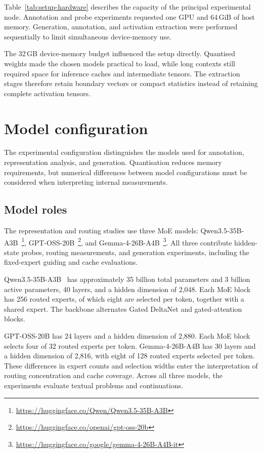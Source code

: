 \documentclass[12pt,a4paper,twoside,openright]{book}
\begin{document}
Table~\ref{tab:setup-hardware} describes the capacity of the principal
experimental node. Annotation and probe experiments requested one GPU and
64\,GiB of host memory. Generation, annotation, and activation extraction
were performed sequentially to limit simultaneous device-memory use.

The 32\,GB device-memory budget influenced the setup directly. Quantised
weights made the chosen models practical to load, while long contexts still
required space for inference caches and intermediate tensors. The extraction
stages therefore retain boundary vectors or compact statistics instead of
retaining complete activation tensors.

\section{Model configuration}
\label{sec:setup-software}

The experimental configuration distinguishes the models used for annotation,
representation analysis, and generation. Quantisation reduces memory
requirements, but numerical differences between model configurations must
be considered when interpreting internal measurements.

\subsection{Model roles}

The representation and routing studies use three MoE models:
Qwen3.5-35B-A3B~\cite{qwen2026qwen35release}\footnote{\url{https://huggingface.co/Qwen/Qwen3.5-35B-A3B}},
GPT-OSS-20B~\cite{openai2025gptoss}\footnote{\url{https://huggingface.co/openai/gpt-oss-20b}},
and Gemma-4-26B-A4B~\cite{gemmateam2026gemma4}\footnote{\url{https://huggingface.co/google/gemma-4-26B-A4B-it}}.
All three contribute
hidden-state probes, routing measurements, and generation experiments,
including the fixed-expert guiding and cache evaluations.

Qwen3.5-35B-A3B~\cite{qwen2026qwen35} has approximately 35 billion total
parameters and 3 billion active parameters, 40 layers, and a hidden dimension
of 2,048. Each MoE block has
256 routed experts, of which eight are selected per token, together with a
shared expert. The backbone alternates Gated DeltaNet and gated-attention
blocks.

GPT-OSS-20B has 24 layers and a hidden dimension of 2,880. Each MoE block
selects four of 32 routed experts per token. Gemma-4-26B-A4B has 30 layers and
a hidden dimension of 2,816, with eight of 128 routed experts selected per
token. These differences in expert counts and selection widths enter the
interpretation of routing concentration and cache coverage. Across all three
models, the experiments evaluate textual problems and continuations.
\end{document}
